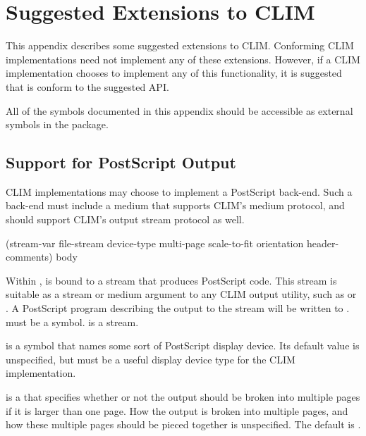 
\chapter {Suggested Extensions to CLIM}
\label {extensions}

This appendix describes some suggested extensions to CLIM.  Conforming CLIM
implementations need not implement any of these extensions.  However, if a CLIM
implementation chooses to implement any of this functionality, it is suggested
that is conform to the suggested API.

All of the symbols documented in this appendix should be accessible as external
symbols in the  package.


\section {Support for PostScript Output}

CLIM implementations may choose to implement a PostScript back-end.  Such a
back-end must include a medium that supports CLIM's medium protocol, and should
support CLIM's output stream protocol as well.

 {(stream-var file-stream
                                               \key device-type multi-page scale-to-fit 
                                                    orientation header-comments) 
                                               \body body} 

Within ,  is bound to a stream that produces
PostScript code.  This stream is suitable as a stream or medium argument to any
CLIM output utility, such as  or .  A PostScript
program describing the output to the  stream will be written to
.   must be a symbol.   is a
stream.

 is a symbol that names some sort of PostScript display device.
Its default value is unspecified, but must be a useful display device type for
the CLIM implementation.

 is a  that specifies whether or not the output
should be broken into multiple pages if it is larger than one page.  How the
output is broken into multiple pages, and how these multiple pages should be
pieced together is unspecified.  The default is .

